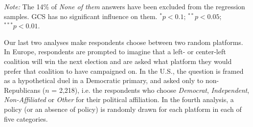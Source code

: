 \documentclass{nature}
\newenvironment{stretchpars}{\par\setlength{\parfillskip}{0pt}}{\par} %
\begin{document}
\begin{table} %
  \caption[Influence of the GCS on electoral prospects]{Preference for a progressive platform depending on whether it includes the GCS or not. (Question 28 in Supplementary Section D) 
Which of these candidates would you vote for? \textit{A; B; None of them} \\
} %
  \makebox[\textwidth][c]{}\label{tab:conjoint_c}
  {\footnotesize \textit{Note:} The 14\% of \textit{None of them} answers have been excluded from the regression samples. GCS has no significant influence on them. $^{*}p<0.1$; $^{**} p<0.05$; $^{***} p<0.01$. 
  }
\end{table}
Our last two analyses  make respondents choose between two random platforms. In Europe, respondents are prompted to imagine that a left- or center-left coalition will win the next election and are asked what platform they would prefer that coalition to have campaigned on. In the U.S., the question is framed as a hypothetical duel in a Democratic primary, and asked only to non-Republicans ($n$ = 2,218), i.e. the respondents who choose \textit{Democrat}, \textit{Independent}, \textit{Non-Affiliated} or \textit{Other} for their political affiliation. In the fourth analysis, a policy (or an absence of policy) is randomly drawn for each platform in each of five categories.%
 
\end{document}
